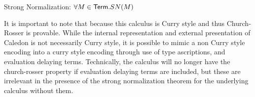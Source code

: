 \begin{theorem}
Strong Normalization:
$\forall M \in \mathsf{Term}. SN(M)$
\end{theorem}

It is important to note that because this calculus is Curry style and thus Church-Rosser is provable.  
While the internal representation and external presentation of Caledon is not necessarily Curry style, 
it is possible to mimic a non Curry style encoding into a curry style encoding through use of type ascriptions,
and evaluation delaying terms.  Technically, the calculus will no longer have the church-rosser property if 
evaluation delaying terms are included, but these are irrelevant in the presence of the strong normalization theorem
for the underlying calculus without them.
